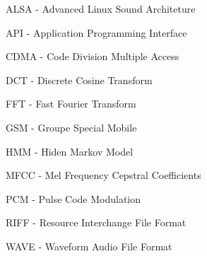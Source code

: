 \begin{acronym}

\item ALSA - Advanced Linux Sound Architeture
\item API - Application Programming Interface


\item CDMA - Code Division Multiple Access

\item DCT - Discrete Cosine Transform

\item FFT - Fast Fourier Transform
\item GSM - Groupe Special Mobile 
\item HMM - Hiden Markov Model




\item MFCC - Mel Frequency Cepstral Coefficients



\item PCM - Pulse Code Modulation

\item RIFF - Resource Interchange File Format



\item WAVE - Waveform Audio File Format




\end{acronym}